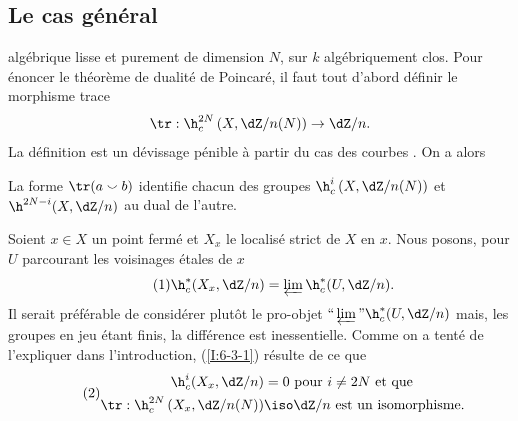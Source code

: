 









\subsection{Le cas général}\label{I:6-3}

 algébrique lisse et purement de dimension $N$, sur 
$k$ algébriquement clos. Pour énoncer le théorème de dualité de 
Poincaré, il faut tout d'abord définir le morphisme trace 
\[
  \tr : \h_c^{2N}\left(X,\dZ/n(N)\right) \to \dZ/n\text{.}
\]
La définition est un dévissage pénible à partir du cas des courbes 
\cite[XVIII \S 2]{sga4}. On a alors 





\begin{theorem}\label{I:6-3-1}
La forme $\tr(a\smallsmile b)$ identifie chacun des groupes 
$\h_c^i\left(X,\dZ/n(N)\right)$ et $\h^{2 N-i}(X,\dZ/n)$ au dual de l'autre.
\end{theorem}

Soient $x\in X$ un point fermé et $X_x$ le localisé strict de $X$ en $x$. 
Nous posons, pour $U$ parcourant les voisinages étales de $x$ 
\begin{equation*}\tag{1}\label{I:eq:6-3-1-1}
  \h_c^*(X_x,\dZ/n) = \varprojlim \h_c^*(U,\dZ/n) \text{.}
\end{equation*}
Il serait préférable de considérer plutôt le pro-objet 
$\text{``}\varprojlim\text{''} \h_c^*(U,\dZ/n)$ mais, les groupes en jeu 
étant finis, la différence est inessentielle. Comme on a tenté de 
l'expliquer dans l'introduction, (\ref{I:6-3-1}) résulte de ce que 
\begin{equation*}\tag{2}\label{I:eq:6-3-1-2}
\begin{aligned}
  \h_c^i(X_x,\dZ/n) &= 0 \text{ pour $i\ne 2N$ et que } \\
  \tr : \h_c^{2 N}\left(X_x,  \dZ/n(N)\right) &\iso \dZ/n \text{ est un isomorphisme.} 
\end{aligned}
\end{equation*}

